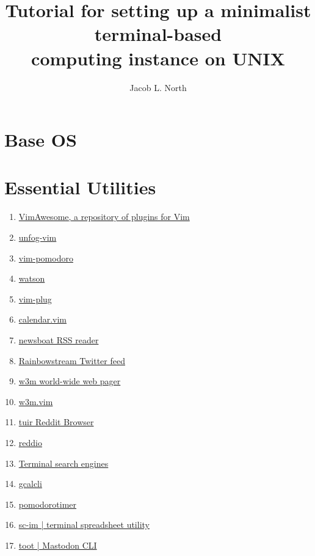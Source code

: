 \documentclass{article}
\title{Tutorial for setting up a minimalist terminal-based\\computing instance on UNIX}
\author{Jacob L. North}
\begin{document}
\maketitle

\vfill

\tableofcontents

\vfill

\section{Base OS}

\section{Essential Utilities}
\begin{enumerate}
    \item \href{https://vimawesome.com/}{VimAwesome, a repository of plugins for Vim}
    \item \href{https://github.com/unfog-io/unfog-vim}{unfog-vim}
    \item \href{https://github.com/mnick/vim-pomodoro}{vim-pomodoro}
    \item \href{https://github.com/TailorDev/Watson}{watson}
    \item \href{https://github.com/junegunn/vim-plug}{vim-plug}
    \item \href{https://github.com/itchyny/calendar.vim}{calendar.vim}
    \item \href{https://github.com/newsboat/newsboat}{newsboat RSS reader}
    \item \href{https://github.com/orakaro/rainbowstream}{Rainbowstream Twitter feed}
    \item \href{https://github.com/tats/w3m}{w3m world-wide web pager}
    \item \href{https://github.com/yuratomo/w3m.vim}{w3m.vim}
    \item \href{https://gitlab.com/ajak/tuir}{tuir Reddit Browser}
    \item \href{https://gitlab.com/aaronNG/reddio}{reddio}
    \item \href{https://vitux.com/four-web-browsers-for-the-linux-command-line/}{Terminal search engines}
    \item \href{https://github.com/insanum/gcalcli}{gcalcli}
    \item \href{https://pypi.org/project/pomodorotimer/}{pomodorotimer}
    \item \href{https://github.com/andmarti1424/sc-im}{sc-im | terminal spreadsheet utility}
    \item \href{https://pypi.org/project/toot/}{toot | Mastodon CLI}
\end{enumerate}
\end{document}
